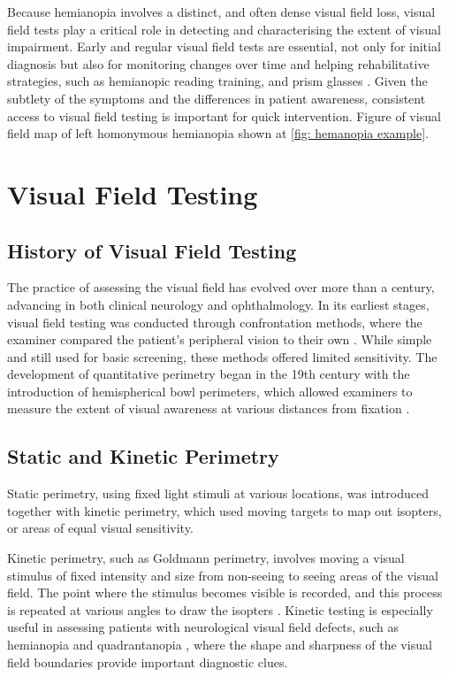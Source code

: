 \documentclass{l4proj}
\begin{document}
Because hemianopia involves a distinct, and often dense visual field loss, visual field tests play a critical role in detecting and characterising the extent of visual impairment. Early and regular visual field tests are essential, not only for initial diagnosis but also for monitoring changes over time and helping rehabilitative strategies, such as hemianopic reading training, and prism glasses \citep{hemanopia4}. Given the subtlety of the symptoms and the differences in patient awareness, consistent access to visual field testing is important for quick intervention. Figure of visual field map of left homonymous hemianopia shown at \ref{fig: hemanopia example}.

\section{Visual Field Testing}

\subsection{History of Visual Field Testing}

The practice of assessing the visual field has evolved over more than a century, advancing in both clinical neurology and ophthalmology. In its earliest stages, visual field testing was conducted through confrontation methods, where the examiner compared the patient’s peripheral vision to their own \citep{vft1}. While simple and still used for basic screening, these methods offered limited sensitivity. The development of quantitative perimetry began in the 19th century with the introduction of hemispherical bowl perimeters, which allowed examiners to measure the extent of visual awareness at various distances from fixation \citep{vft1}.

\subsection{Static and Kinetic Perimetry}
Static perimetry, using fixed light stimuli at various locations, was introduced together with kinetic perimetry, which used moving targets to map out isopters, or areas of equal visual sensitivity.

Kinetic perimetry, such as Goldmann perimetry, involves moving a visual stimulus of fixed intensity and size from non-seeing to seeing areas of the visual field. The point where the stimulus becomes visible is recorded, and this process is repeated at various angles to draw the isopters \citep{vft2}. Kinetic testing is especially useful in assessing patients with neurological visual field defects, such as hemianopia and quadrantanopia \citep{hemanopia1}, where the shape and sharpness of the visual field boundaries provide important diagnostic clues.
\end{document}
